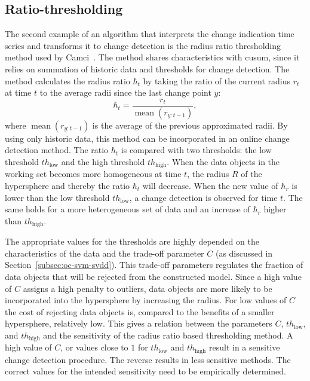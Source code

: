\subsection{Ratio-thresholding}\label{subsec:ratio_thresholding}
The second example of an algorithm that interprets the change indication time series and transforms it to change detection is the radius ratio thresholding method used by Camci~\cite{camci2010change}.
The method shares characteristics with \gls{cusum}, since it relies on summation of historic data and thresholds for change detection.
The method calculates the radius ratio $\hbar_t$ by taking the ratio of the current radius $r_t$ at time $t$ to the average radii since the last change point $y$:
\begin{equation}\label{eq:ratio_radius}
  \hbar_t = \frac{r_t}{\operatorname*{mean}(r_{y:t-1})},
\end{equation}
where $\operatorname*{mean}(r_{y:t-1})$ is the average of the previous approximated radii.
By using only historic data, this method can be incorporated in an online change detection method.
The ratio $\hbar_t$ is compared with two thresholds: the low threshold $th_\text{low}$ and the high threshold $th_\text{high}$.
When the data objects in the working set becomes more homogeneous at time $t$, the radius $R$ of the hypersphere and thereby the ratio $\hbar_t$ will decrease.
When the new value of $\hbar_r$ is lower than the low threshold $th_\text{low}$, a change detection is observed for time $t$.
The same holds for a more heterogeneous set of data and an increase of $\hbar_r$ higher than $th_\text{high}$.

The appropriate values for the thresholds are highly depended on the characteristics of the data and the trade-off parameter $C$ (as discussed in Section~\ref{subsec:oc-svm-svdd}).
This trade-off parameters regulates the fraction of data objects that will be rejected from the constructed model.
Since a high value of $C$ assigns a high penalty to outliers, data objects are more likely to be incorporated into the hypersphere by increasing the radius.
For low values of $C$ the cost of rejecting data objects is, compared to the benefits of a smaller hypersphere, relatively low.
This gives a relation between the parameters $C$, $th_\text{low}$, and $th_\text{high}$ and the sensitivity of the radius ratio based thresholding method.
A high value of $C$, or values close to $1$ for $th_\text{low}$ and $th_\text{high}$ result in a sensitive change detection procedure.
The reverse results in less sensitive methods.
The correct values for the intended sensitivity need to be empirically determined.

